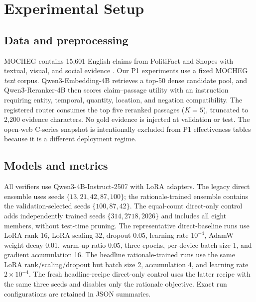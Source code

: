 \documentclass[11pt]{article}
\begin{document}
\section{Experimental Setup}
\subsection{Data and preprocessing}
MOCHEG contains 15,601 English claims from PolitiFact and Snopes with textual, visual, and social evidence \citep{yao2023mocheg}. Our P1 experiments use a fixed MOCHEG \emph{text} corpus. Qwen3-Embedding-4B retrieves a top-50 dense candidate pool, and Qwen3-Reranker-4B then scores claim--passage utility with an instruction requiring entity, temporal, quantity, location, and negation compatibility. The registered router consumes the top five reranked passages ($K=5$), truncated to 2,200 evidence characters. No gold evidence is injected at validation or test. The open-web C-series snapshot is intentionally excluded from P1 effectiveness tables because it is a different deployment regime.

\begin{table}[t]
\centering\small
{}
\caption{Protocol sizes. Official and strict test results are not pooled.}
\label{tab:splits}
\end{table}

\subsection{Models and metrics}
All verifiers use Qwen3-4B-Instruct-2507 with LoRA adapters. The legacy direct ensemble uses seeds $\{13,21,42,87,100\}$; the rationale-trained ensemble contains the validation-selected seeds $\{100,87,42\}$. The equal-count direct-only control adds independently trained seeds $\{314,2718,2026\}$ and includes all eight members, without test-time pruning. The representative direct-baseline runs use LoRA rank 16, LoRA scaling 32, dropout 0.05, learning rate $10^{-4}$, AdamW weight decay 0.01, warm-up ratio 0.05, three epochs, per-device batch size 1, and gradient accumulation 16. The headline rationale-trained runs use the same LoRA rank/scaling/dropout but batch size 2, accumulation 4, and learning rate $2\times10^{-4}$. The fresh headline-recipe direct-only control uses the latter recipe with the same three seeds and disables only the rationale objective. Exact run configurations are retained in JSON summaries.
\end{document}
